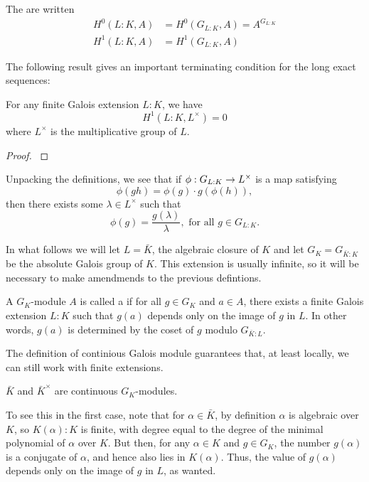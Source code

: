 \documentclass[12pt, a4paper]{report}
\begin{document}
\begin{defn}
  The  are written
  \begin{equation*}
    \begin{split}
      H^0(L:K, A) &= H^0(G_{L:K}, A) = A^{G_{L:K}} \\
      H^1(L:K, A) &= H^1(G_{L:K}, A)
     \end{split}
   \end{equation*}
\end{defn}

The following result gives an important terminating condition for the
long exact sequences:

\begin{thm}
  For any finite Galois extension $L:K$, we have
  \[ H^1(L : K, L^{\times}) = 0\]
  where $L^\times$ is the multiplicative group of $L$.
\end{thm}
\begin{proof}
  \cite[See][Chapter X, page 150]{cohomology}
\end{proof}

Unpacking the definitions, we see that if $\phi : G_{L:K} \rightarrow L^\times$ is a map
satisfying
\[\phi(gh)=\phi(g) \cdot g (\phi(h)),\]
then there exists some $\lambda \in L^\times$ such that
$$\phi(g) = \frac{g(\lambda)}{\lambda}, \text{ for all } g \in G_{L:K}. $$

In what follows we will let $L = \bar{K}$, the algebraic closure of $K$ and let
$G_K = G_{\bar{K}:K}$ be the absolute Galois group of $K$.
This extension is usually infinite, so
it will be necessary to make amendmends to the previous defintions. 

\begin{defn}
  A $G_K$-module $A$ is called a 
  if for all $g \in G_K$ and $ a \in A$,
  there exists a finite Galois extension $L:K$ such that $g(a)$
  depends only on the image of $g$ in $L$. In other words, $g(a)$ is determined
  by the coset of $g$ modulo $G_{\bar{K}:L}$.
\end{defn}

The definition of continious Galois module guarantees that, at least locally, we
can still work with finite extensions.

\begin{example}
  $\bar{K}$ and $ \bar{K}^{\times}$ are continuous $G_K$-modules.

  To see this in the first case,
  note that for $\alpha \in \bar{K}$, by definition $\alpha$ is algebraic over
  $K$, so $K(\alpha) : K$ is finite, with degree equal to the degree of the
  minimal polynomial of $\alpha$ over $K$.
  But then, for any $\alpha \in K$ and $g \in G_K$, the number $g(\alpha)$ is a conjugate
  of $\alpha$, and hence also lies in $K(\alpha).$ Thus, the value of
  $g(\alpha)$ depends only on the image of $g$ in $L$, as wanted.
\end{example}
\end{document}
